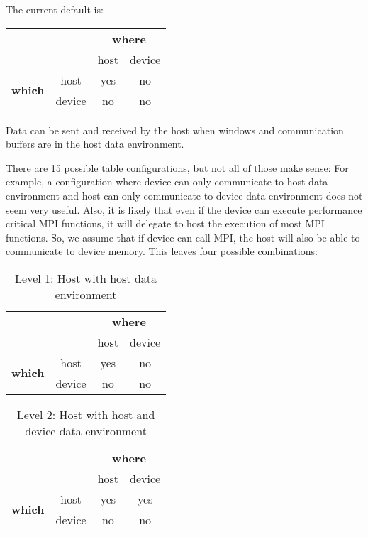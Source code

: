 \documentclass[twoside,11pt]{article}
\begin{document}
The current default is:
\begin{table}[H]
\begin{tabular}{|c|c|c|c|}
	\cline{3-4}
	\multicolumn{2}{c|}{} & \multicolumn{2}{c|}{\textbf{where}} \\
	\cline{3-4}
	\multicolumn{2}{c|}{} & host & device \\
	\hline
	\multirow{2}{30 pt}{\textbf{which}} & host & yes & no \\
	\cline{2-4}
	& device & no & no \\
	\hline
\end{tabular}
\end{table}
Data can be sent and received by the host when windows and communication 
buffers are in the host data environment.

There are 15 possible table configurations, but not all of those make sense:  
For example, a configuration where device can only communicate to host data 
environment and host can only communicate to device data environment does not 
seem very useful. 
Also, it is likely that even if the device can execute performance critical MPI 
functions, it will delegate to host the execution of most MPI functions. So, we 
assume that if device can call MPI, the host will also be able to communicate 
to device memory. This leaves four possible combinations:

\begin{table}[H]
\begin{tabular}{|c|c|c|c|}
	\cline{3-4}
	\multicolumn{2}{c|}{} & \multicolumn{2}{c|}{\textbf{where}} \\
	\cline{3-4}
	\multicolumn{2}{c|}{} & host & device \\
	\hline
	\multirow{2}{30 pt}{\textbf{which}} & host & yes & no \\
	\cline{2-4}
	& device & no & no \\
	\hline
	\end{tabular}
\caption*{Level 1: Host with host data environment}
\end{table}

\begin{table}[H]
\begin{tabular}{|c|c|c|c|}
	\cline{3-4}
	\multicolumn{2}{c|}{} & \multicolumn{2}{c|}{\textbf{where}} \\
	\cline{3-4}
	\multicolumn{2}{c|}{} & host & device \\
	\hline
	\multirow{2}{30 pt}{\textbf{which}} & host & yes & yes \\
	\cline{2-4}
	& device & no & no \\
	\hline
	\end{tabular}
	\caption*{Level 2: Host with host and device data environment}
\end{table}
\end{document}
